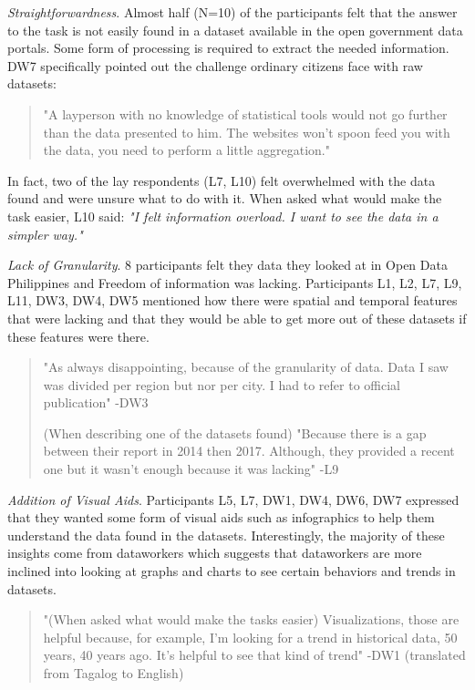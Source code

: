 \documentclass{sigchi}
\begin{document}

\textit{Straightforwardness}. Almost half (N=10) of the participants felt that the answer to the task is not easily found in a dataset available in the open government data portals. Some form of processing is required to extract the needed information. DW7 specifically pointed out the challenge ordinary citizens face with raw datasets:
\begin{quote}
"A layperson with no knowledge of statistical tools would not go further than the data presented to him. The websites won't spoon feed you with the data, you need to perform a little aggregation."
\end{quote}

In fact, two of the lay respondents (L7, L10) felt overwhelmed with the data found and were unsure what to do with it. When asked what would make the task easier, L10 said: \textit{"I felt information overload. I want to see the data in a simpler way."}





\textit{Lack of Granularity}. 8 participants felt they data they looked at in Open Data Philippines and Freedom of information was lacking. Participants L1, L2, L7, L9, L11, DW3, DW4, DW5 mentioned how there were spatial and temporal features that were lacking and that they would be able to get more out of these datasets if these features were there.
\begin{quote}
"As always disappointing, because of the granularity of data. Data I saw was divided per region but nor per city. I had to refer to official publication" -DW3

(When describing one of the datasets found) "Because there is a gap between their report in 2014 then 2017. Although, they provided a recent one but it wasn't enough because it was lacking" -L9
\end{quote}

\textit{Addition of Visual Aids}. Participants L5, L7, DW1, DW4, DW6, DW7 expressed that they wanted some form of visual aids such as infographics to help them understand the data found in the datasets. Interestingly, the majority of these insights come from dataworkers which suggests that dataworkers are more inclined into looking at graphs and charts to see certain behaviors and trends in datasets. 
\begin{quote}
"(When asked what would make the tasks easier) Visualizations, those are helpful because, for example, I'm looking for a trend in historical data, 50 years, 40 years ago. It's helpful to see that kind of trend" -DW1 (translated from Tagalog to English)
\end{quote}
\end{document}
